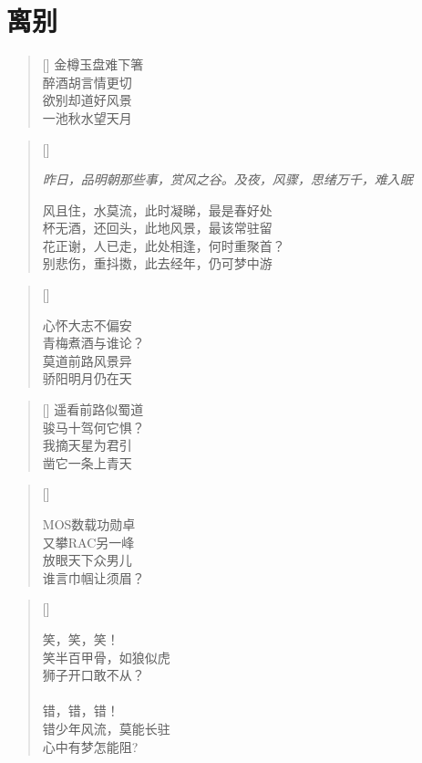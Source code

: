 \chapter{离别}
\thispagestyle{empty}
\renewcommand{\poemtoc}{section}
\settowidth{\versewidth}{秋风不知离别味}
\begin{verse}[\versewidth]
金樽玉盘难下箸\\
醉酒胡言情更切\\
欲别却道好风景\\
一池秋水望天月
\end{verse}

\renewcommand{\poemtoc}{section}
\settowidth{\versewidth}{风且住，水莫流，此时凝睇，最是春好处}
\begin{verse}[\versewidth]

\emph{\scriptsize{昨日，品明朝那些事，赏风之谷。及夜，风骤，思绪万千，难入眠}}

风且住，水莫流，此时凝睇，最是春好处\\
杯无酒，还回头，此地风景，最该常驻留\\
花正谢，人已走，此处相逢，何时重聚首？\\
别悲伤，重抖擞，此去经年，仍可梦中游\\
\end{verse}

\renewcommand{\poemtoc}{section}
\settowidth{\versewidth}{心怀大志不偏安}
\begin{verse}[\versewidth]

心怀大志不偏安\\
青梅煮酒与谁论？\\
莫道前路风景异\\
骄阳明月仍在天
\end{verse}

\renewcommand{\poemtoc}{section}
\settowidth{\versewidth}{心怀大志不偏安}
\begin{verse}[\versewidth]
遥看前路似蜀道\\
骏马十驾何它惧？\\
我摘天星为君引\\
凿它一条上青天
\end{verse}

\renewcommand{\poemtoc}{section}
\settowidth{\versewidth}{MOS数载功勋卓}
\begin{verse}[\versewidth]

MOS数载功勋卓\\
又攀RAC另一峰\\
放眼天下众男儿\\
谁言巾帼让须眉？
\end{verse}

\renewcommand{\poemtoc}{section}
\settowidth{\versewidth}{MOS数载功勋卓}
\begin{verse}[\versewidth]

笑，笑，笑！\\
笑半百甲骨，如狼似虎\\
狮子开口敢不从？\\
~\\
错，错，错！\\
错少年风流，莫能长驻\\
心中有梦怎能阻?\\
\end{verse}

